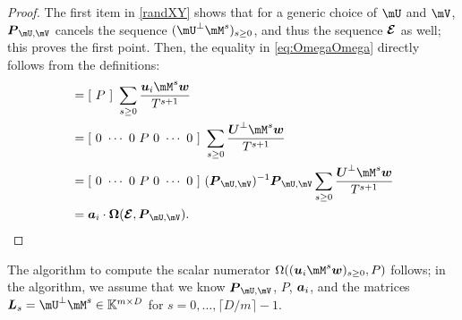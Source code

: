 \documentclass[12pt]{article}
\newcommand{\mat}[1]{\bm{\MakeUppercase{#1}}} %
\newcommand{\row}[1]{\bm{\MakeLowercase{#1}}} %
\newcommand{\col}[1]{\bm{\MakeLowercase{#1}}} %
\newcommand{\minpoly}{P}
\def\K{\mathbb{K}}
\def\K {\ensuremath{\mathbb{K}}}
\begin{document}
\begin{proof}
The first item in \cref{randXY} shows that for a generic choice of
$\mU$ and $\mV$, $\mat{P}_{\mU,\mV}$ cancels the sequence $(\mU^\perp
\mM^s)_{s \ge 0}$, and thus the sequence $\mat{\mathcal{E}}$ as well;
this proves the first point. Then, the equality
in \cref{eq:OmegaOmega} directly follows from the definitions:
\begin{align*}
[~ \Omega((\row{u}_i \mM^s \col{w})_{s \ge 0}, \minpoly)~]  &= [~\minpoly~]\ \sum_{s \ge 0} \frac{\row{u}_i \mM^s \col{w}}{T^{s+1}}\\
&=  [~0~\cdots~0~\minpoly~0~\cdots~0~]\  \sum_{s \ge 0} \frac{\mat{U}^\perp \mM^s \col{w}}{T^{s+1}}\\
&=  [~0~\cdots~0~\minpoly~0~\cdots~0~]\ (\mat{P}_{\mU,\mV})^{-1} \mat{P}_{\mU,\mV} \sum_{s \ge 0} \frac{\mat{U}^\perp \mM^s \col{w}}{T^{s+1}}\\
&=  \row{a}_i\cdot \mat{\Omega}(\mat{\mathcal{E}}, \mat{P}_{\mU,\mV}).
\qedhere
\end{align*}
\end{proof}

The algorithm to compute the scalar numerator $\Omega((\row{u}_i \mM^s
\col{w})_{s \ge 0}, \minpoly)$ follows; in the algorithm, we
assume that we know $\mat{P}_{\mU,\mV}$, $P$, $\row{a}_i$, and the
matrices $\mat{L}_s=\mU^\perp \mM^s \in \K^{m \times D}$ for
$s=0,\dots,\lceil D/m \rceil-1$.
\end{document}

